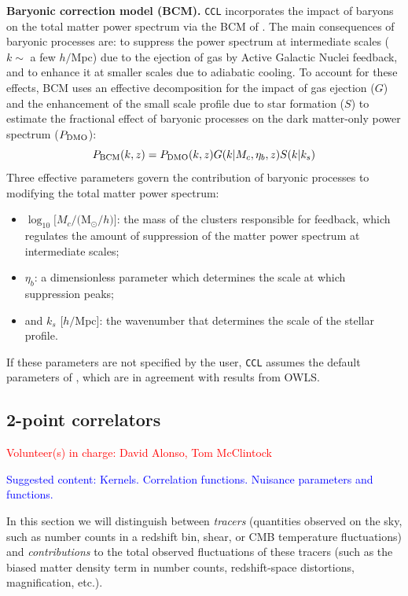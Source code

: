 \documentclass[\docopts]{\docclass}
\newcommand{\vol}[1]{\textcolor{red}{Volunteer(s) in charge: #1}}
\newcommand{\cont}[1]{\textcolor{blue}{Suggested content: #1}}
\newcommand{\ccl}{{\tt CCL}\xspace}
\begin{document}
 {\bf Baryonic correction model (BCM).} \ccl incorporates the impact of baryons on the total matter power spectrum via the BCM of \citet{Schneider15}. The main consequences of baryonic processes are: to suppress the power spectrum at intermediate scales ($k\sim$ a few $h/$Mpc) due to the ejection of gas by Active Galactic Nuclei feedback, and to enhance it at smaller scales due to adiabatic cooling. To account for these effects, BCM uses an effective decomposition for the impact of gas ejection ($G$) and the enhancement of the small scale profile due to star formation ($S$) to estimate the fractional effect of baryonic processes on the dark matter-only power spectrum ($P_{\rm DMO}$):
\begin{equation}
  P_{\rm BCM}(k,z)=P_{\rm DMO}(k,z) G(k|M_c,\eta_b,z)S(k|k_s)
\end{equation}
Three effective parameters govern the contribution of baryonic processes to modifying the total matter power spectrum:
 \begin{itemize}
   \item $\log_{10} [M_c/($M$_\odot/h)]$: the mass of the clusters responsible for feedback, which regulates the amount of suppression of the matter power spectrum at intermediate scales;
   \item $\eta_b$: a dimensionless parameter which determines the scale at which suppression peaks;
   \item and $k_s$ [$h/$Mpc]: the wavenumber that determines the scale of the stellar profile.
 \end{itemize}
 If these parameters are not specified by the user, \ccl assumes the default parameters of \citet{Schneider15}, which are in agreement with results from OWLS.

\subsection{2-point correlators}
\vol{David Alonso, Tom McClintock}

\cont{Kernels. Correlation functions. Nuisance parameters and functions.}

In this section we will distinguish between {\sl tracers} (quantities observed on the sky, such as number counts in a redshift bin, shear, or CMB temperature fluctuations) and {\sl contributions} to the total observed fluctuations of these tracers (such as the biased matter density term in number counts, redshift-space distortions, magnification, etc.).
\end{document}
